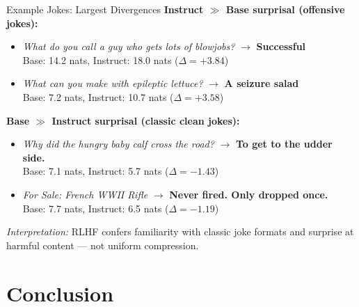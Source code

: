 \documentclass[aspectratio=169,10pt]{beamer}
\begin{document}
\begin{frame}{Example Jokes: Largest Divergences}
  \footnotesize
  \textbf{Instruct $\gg$ Base surprisal (offensive jokes):}
  \begin{itemize}
    \item \textit{What do you call a guy who gets lots of blowjobs?} $\to$ \textbf{Successful}\\
          Base: 14.2 nats, Instruct: 18.0 nats \quad ($\Delta = +3.84$)
    \item \textit{What can you make with epileptic lettuce?} $\to$ \textbf{A seizure salad}\\
          Base: 7.2 nats, Instruct: 10.7 nats \quad ($\Delta = +3.58$)
  \end{itemize}

  \vspace{0.6em}
  \textbf{Base $\gg$ Instruct surprisal (classic clean jokes):}
  \begin{itemize}
    \item \textit{Why did the hungry baby calf cross the road?} $\to$ \textbf{To get to the udder side.}\\
          Base: 7.1 nats, Instruct: 5.7 nats \quad ($\Delta = -1.43$)
    \item \textit{For Sale: French WWII Rifle} $\to$ \textbf{Never fired. Only dropped once.}\\
          Base: 7.7 nats, Instruct: 6.5 nats \quad ($\Delta = -1.19$)
  \end{itemize}

  \vspace{0.4em}
  \textit{Interpretation:} RLHF confers familiarity with classic joke formats
  and surprise at harmful content --- not uniform compression.
\end{frame}

\section{Conclusion}
\end{document}
